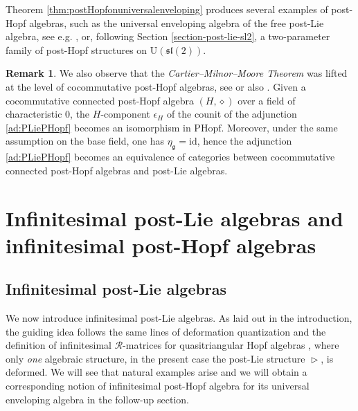 \documentclass[10pt]{article}
\theoremstyle{definition}
\newtheorem{remark}[lemma]{Remark}
\newcommand{\g}{\mathfrak{g}}
\newcommand{\wt}{\vartriangleright}
\newcommand{\s}{\mathfrak{s}}
\renewcommand{\l}{\mathfrak{l}}
\renewcommand{\wp}{\diamond}
\begin{document}
Theorem \ref{thm:postHopfonuniversalenveloping} produces several examples of post-Hopf algebras, such as the universal enveloping algebra of the free post-Lie algebra, see e.g. \cite{Foissy,Li}, or, following Section \ref{section-post-lie-sl2}, a two-parameter family of post-Hopf structures on $\mathrm{U}(\s\l(2))$. 

\begin{remark}\label{rmk:MilnorMoorepostHopf}
We also observe that the \emph{Cartier--Milnor--Moore Theorem} \cite{MilnorMoore} was lifted at the level of cocommutative post-Hopf algebras, see \cite[Corollary 28]{Catoire} or also \cite[Theorem 4.21 and Corollaries 4.22 and 4.23]{ZD}. Given a cocommutative connected post-Hopf algebra $(H,\wp)$ over a field of characteristic 0, the $H$-component $\epsilon_H$ of the counit of the adjunction \eqref{ad:PLiePHopf} becomes an isomorphism in $\mathrm{PHopf}$. Moreover, under the same assumption on the base field, one has 
$\eta_{\g}=\mathrm{id}$, hence the adjunction \eqref{ad:PLiePHopf} becomes an equivalence of categories between cocommutative connected post-Hopf algebras and post-Lie algebras.
\end{remark}


\section{Infinitesimal post-Lie algebras and infinitesimal post-Hopf algebras}



\subsection{Infinitesimal post-Lie algebras}\label{sec:IPL}

We now introduce infinitesimal post-Lie algebras. As laid out in the introduction, the guiding idea follows the same lines of deformation quantization \cite{BFFLS} and the definition of infinitesimal $\mathcal{R}$-matrices for quasitriangular Hopf algebras \cite{ABSW}, where only \emph{one} algebraic structure, in the present case the post-Lie structure $\wt$, is deformed. We will see that natural examples arise and we will obtain a corresponding notion of infinitesimal post-Hopf algebra for its universal enveloping algebra in the follow-up section.
\end{document}
